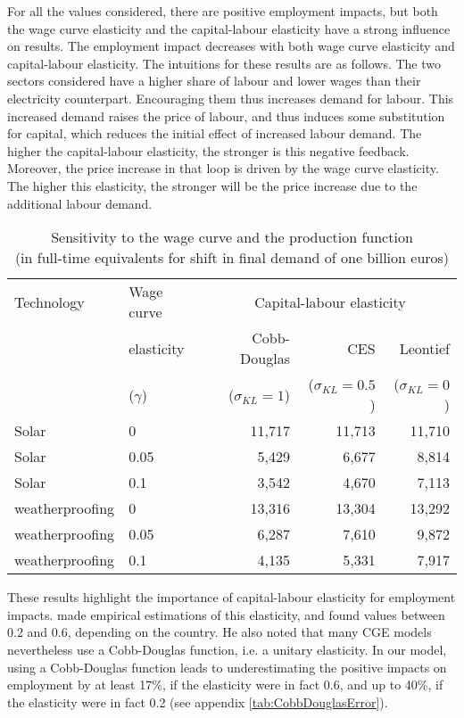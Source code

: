 For all the values considered, there are positive employment impacts, but both the wage curve elasticity and the capital-labour elasticity have a strong influence on results. The employment impact decreases with both wage curve elasticity and capital-labour elasticity.
The intuitions for these results are as follows. The two sectors considered have a higher share of labour and lower wages than their electricity counterpart. Encouraging them thus increases demand for labour. This increased demand raises the price of labour, and thus induces some substitution for capital, which reduces the initial effect of increased labour demand. The higher the capital-labour elasticity, the stronger is this negative feedback.
Moreover, the price increase in that loop is driven by the wage curve elasticity. The higher this elasticity, the stronger will be the price increase due to the additional labour demand. 

\begin{table}[!h]
	\centering
	\caption{Sensitivity to the wage curve and the production function \\ (in full-time equivalents for shift in final demand of one billion euros)}
	\label{tab:wageCurve}
	\begin{tabular}{ll|rrr}
		\toprule
		Technology & Wage curve & \multicolumn{3}{c}{Capital-labour elasticity} \\
		& elasticity      & Cobb-Douglas & CES & Leontief \\
		&	($\gamma$)  &($\sigma_{KL}=1$) & ($\sigma_{KL}=0.5$) & ($\sigma_{KL}=0$) \\
		\midrule
		Solar & 0 & 11,717 & 11,713 & 11,710 \\
		Solar & 0.05 & 5,429 & 6,677 & 8,814 \\
		Solar & 0.1 & 3,542 & 4,670 & 7,113 \\
		\midrule
		weatherproofing & 0 & 13,316 & 13,304 & 13,292 \\
		weatherproofing & 0.05 & 6,287 & 7,610 & 9,872 \\
		weatherproofing & 0.1 & 4,135 & 5,331 & 7,917 \\
		\bottomrule
	\end{tabular}
\end{table}

These results highlight the importance of capital-labour elasticity for employment impacts. 
\citet{VanderWerf2008} made empirical estimations of this elasticity, and found values between 0.2 and 0.6, depending on the country.  He also noted that many CGE models nevertheless use a Cobb-Douglas function, i.e. a unitary elasticity. In our model, using a Cobb-Douglas function leads to underestimating the positive impacts on employment by at least 17\%, if the elasticity were in fact 0.6, and up to 40\%, if the elasticity were in fact 0.2 (see appendix \ref{tab:CobbDouglasError}).

